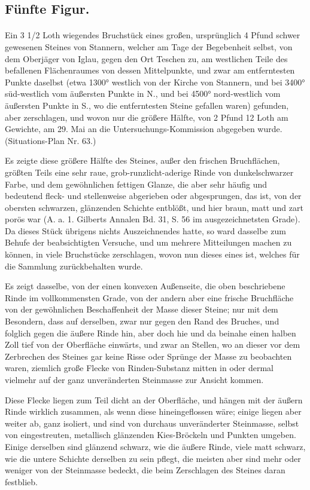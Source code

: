 \documentclass[a4paper, 11pt, oneside, german]{article}
\begin{document}
\subsection{Fünfte Figur.}
\paragraph{}
Ein 3 1/2 Loth wiegendes Bruchstück eines großen, ursprünglich 4 Pfund schwer gewesenen Steines von Stannern, welcher am Tage der Begebenheit selbst, von dem Oberjäger von Iglau, gegen den Ort Teschen zu, am westlichen Teile des befallenen Flächenraumes von dessen Mittelpunkte, und zwar am entferntesten Punkte daselbst (etwa 1300° westlich von der Kirche von Stannern, und bei 3400° süd-westlich vom äußersten Punkte in N., und bei 4500° nord-westlich vom äußersten Punkte in S., wo die entferntesten Steine gefallen waren) gefunden, aber zerschlagen, und wovon nur die größere Hälfte, von 2 Pfund 12 Loth am Gewichte, am 29. Mai an die Untersuchungs-Kommission abgegeben wurde. (Situations-Plan Nr. 63.)

Es zeigte diese größere Hälfte des Steines, außer den frischen Bruchflächen, größten Teils eine sehr raue, grob-runzlicht-aderige Rinde von dunkelschwarzer Farbe, und dem gewöhnlichen fettigen Glanze, die aber sehr häufig und bedeutend fleck- und stellenweise abgerieben oder abgesprungen, das ist, von der obersten schwarzen, glänzenden Schichte entblößt, und hier braun, matt und zart porös war (A. a. 1. Gilberts Annalen Bd. 31, S. 56 im ausgezeichnetsten Grade). Da dieses Stück übrigens nichts Auszeichnendes hatte, so ward dasselbe zum Behufe der beabsichtigten Versuche, und um mehrere Mitteilungen machen zu können, in viele Bruchstücke zerschlagen, wovon nun dieses eines ist, welches für die Sammlung zurückbehalten wurde.

Es zeigt dasselbe, von der einen konvexen Außenseite, die oben beschriebene Rinde im vollkommensten Grade, von der andern aber eine frische Bruchfläche von der gewöhnlichen Beschaffenheit der Masse dieser Steine; nur mit dem Besondern, dass auf derselben, zwar nur gegen den Rand des Bruches, und folglich gegen die äußere Rinde hin, aber doch hie und da beinahe einen halben Zoll tief von der Oberfläche einwärts, und zwar an Stellen, wo an dieser vor dem Zerbrechen des Steines gar keine Risse oder Sprünge der Masse zu beobachten waren, ziemlich große Flecke von Rinden-Substanz mitten in oder dermal vielmehr auf der ganz unveränderten Steinmasse zur Ansicht kommen.

Diese Flecke liegen zum Teil dicht an der Oberfläche, und hängen mit der äußern Rinde wirklich zusammen, als wenn diese hineingeflossen wäre; einige liegen aber weiter ab, ganz isoliert, und sind von durchaus unveränderter Steinmasse, selbst von eingestreuten, metallisch glänzenden Kies-Bröckeln und Punkten umgeben. Einige derselben sind glänzend schwarz, wie die äußere Rinde, viele matt schwarz, wie die untere Schichte derselben zu sein pflegt, die meisten aber sind mehr oder weniger von der Steinmasse bedeckt, die beim Zerschlagen des Steines daran festblieb.
\end{document}
